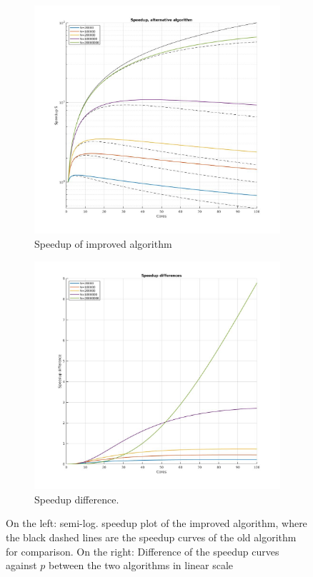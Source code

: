 \documentclass{article}
\begin{document}
\begin{figure}[H]
  \begin{subfigure}[h]{0.5\textwidth}
    \includegraphics[width=1.1\textwidth]{th_scaling_2}
    \caption{Speedup of improved algorithm}
    \label{th_speedup_2a}
  \end{subfigure}
  \begin{subfigure}[h]{0.5\textwidth}
    \includegraphics[width=1.1\textwidth]{th_scaling_comp}
    \caption{Speedup difference.}
    \label{th_speedup_2b}
  \end{subfigure}
   \caption{On the left: semi-log. speedup plot of the improved algorithm, where the black dashed lines are the speedup curves of the old algorithm for comparison. On the right: Difference of the speedup curves against $p$ between the two algorithms in linear scale}
   \label{th_speedup_2}
\end{figure}
\end{document}

